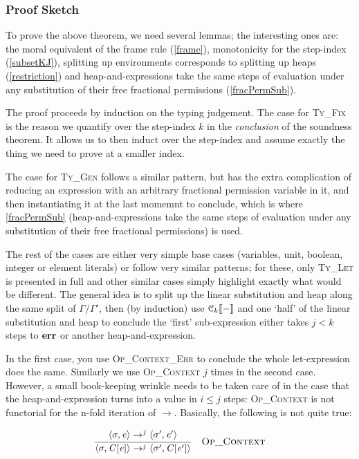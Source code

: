 \subsubsection{Proof Sketch}

To prove the above theorem, we need several lemmas; the interesting ones are:
the moral equivalent of the frame rule (\ref{frame}), monotonicity for the
step-index (\ref{subsetKJ}), splitting up environments corresponds to splitting
up heaps (\ref{restriction}) and heap-and-expressions take the same steps of
evaluation under any substitution of their free fractional permissions
(\ref{fracPermSub}).

The proof proceeds by induction on the typing judgement.  The case for
\textsc{Ty\_Fix} is the reason we quantify over the step-index $k$ in the
\emph{conclusion} of the soundness theorem. It allows us to then induct over
the step-index and assume exactly the thing we need to prove at a smaller index.

The case for \textsc{Ty\_Gen} follows a similar pattern, but has the extra
complication of reducing an expression with an arbitrary fractional permission
variable in it, and then instantiating it at the last momemnt to conclude,
which is where \ref{fracPermSub} (heap-and-expressions take the same steps of
evaluation under any substitution of their free fractional permissions) is
used.

The rest of the cases are either very simple base cases (variables, unit,
boolean, integer or element literals) or follow very similar patterns; for
these, only \textsc{Ty\_Let} is presented in full and other similar cases
simply highlight exactly what would be different.  The general idea is to split
up the linear substitution and heap along the same split of $\Gamma/\Gamma'$,
then (by induction) use $\mathcal{C}_{k} [\![ - ]\!]$ and one `half' of the  linear substitution
and heap to conclude the `first' sub-expression either takes $j< k$ steps to
$\mathbf{err}$ or another heap-and-expression.

In the first case, you use \textsc{Op\_Context\_Err} to conclude the whole
let-expression does the same. Similarly we use \textsc{Op\_Context} $j$ times
in the second case. However, a small book-keeping wrinkle needs to be taken
care of in the case that the heap-and-expression turns into a value in $i \leq
j$ steps: \textsc{Op\_Context} is not functorial for the n-fold iteration of
$\rightarrow$.  Basically, the following is not quite true:

\vspace{-\baselineskip}
\[
\ottdrule{%
    \ottpremise{\langle  \sigma  \ottsym{,}  \ottnt{e}  \rangle  \rightarrow^j  \langle  \sigma'  \ottsym{,}  \ottnt{e'}  \rangle}%
    }{
    \langle  \sigma  \ottsym{,}  \ottnt{C}  \ottsym{[}  \ottnt{e}  \ottsym{]}  \rangle  \rightarrow^j  \langle  \sigma'  \ottsym{,}  \ottnt{C}  \ottsym{[}  \ottnt{e'}  \ottsym{]}  \rangle}{%
    {\ottdrulename{Op\_Context}}{}%
}
\]

